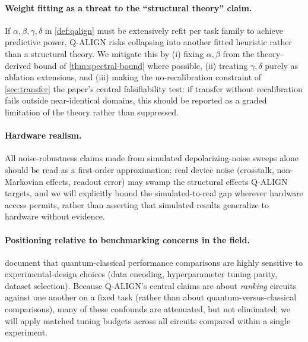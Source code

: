 \documentclass[11pt]{article}
\begin{document}
\paragraph{Weight fitting as a threat to the ``structural theory'' claim.} If $\alpha,\beta,\gamma,\delta$ in \cref{def:qalign} must be extensively refit per task family to achieve predictive power, Q-ALIGN risks collapsing into another fitted heuristic rather than a structural theory. We mitigate this by (i) fixing $\alpha,\beta$ from the theory-derived bound of \cref{thm:spectral-bound} where possible, (ii) treating $\gamma,\delta$ purely as ablation extensions, and (iii) making the no-recalibration constraint of \cref{sec:transfer} the paper's central falsifiability test: if transfer without recalibration fails outside near-identical domains, this should be reported as a graded limitation of the theory rather than suppressed.

\paragraph{Hardware realism.} All noise-robustness claims made from simulated depolarizing-noise sweeps alone should be read as a first-order approximation; real device noise (crosstalk, non-Markovian effects, readout error) may swamp the structural effects Q-ALIGN targets, and we will explicitly bound the simulated-to-real gap wherever hardware access permits, rather than asserting that simulated results generalize to hardware without evidence.

\paragraph{Positioning relative to benchmarking concerns in the field.} \citet{bowles2024better} document that quantum-classical performance comparisons are highly sensitive to experimental-design choices (data encoding, hyperparameter tuning parity, dataset selection). Because Q-ALIGN's central claims are about \emph{ranking} circuits against one another on a fixed task (rather than about quantum-versus-classical comparisons), many of these confounds are attenuated, but not eliminated; we will apply matched tuning budgets across all circuits compared within a single experiment.
\end{document}
